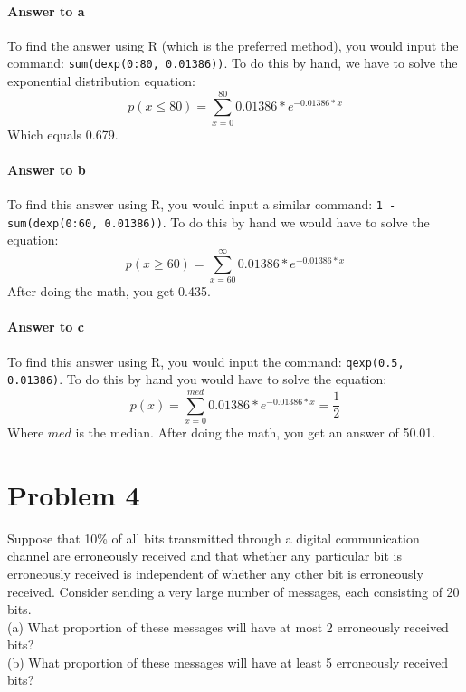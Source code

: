 \documentclass{article}
\newcommand{\code}[1]{\texttt{#1}}
\begin{document}
	\paragraph{Answer to a} To find the answer using R (which is the preferred method), you would 
	input the command: \code{sum(dexp(0:80, 0.01386))}. To do this by hand, we have to solve the 	exponential distribution equation:
	\begin{displaymath}
		p(x \le 80) = \sum_{x=0}^{80} 0.01386*e^{-0.01386*x}
	\end{displaymath}
	Which equals 0.679. %
	
	\paragraph{Answer to b}  To find this answer using R, you would input a similar command: 
	\code{1 - sum(dexp(0:60, 0.01386))}. To do this by hand we would have to solve the equation:
	\begin{displaymath}
		p(x \ge 60) = \sum_{x=60}^{\infty} 0.01386*e^{-0.01386*x}
	\end{displaymath}
	After doing the math, you get 0.435. %
	
	\paragraph{Answer to c} To find this answer using R, you would input the command: 
	\code{qexp(0.5, 0.01386)}. To do this by hand you would have to solve the equation:
	\begin{displaymath}
		p(x) = \sum_{x=0}^{med} 0.01386*e^{-0.01386*x} = \frac{1}{2}
	\end{displaymath}
	Where $med$ is the median. After doing the math, you get an answer of 50.01. %

\clearpage
\section*{Problem 4}

	Suppose that 10\% of all bits transmitted through a digital communication channel are 
	erroneously received and that whether any particular bit is erroneously received is independent 
	of whether any other bit is erroneously received. Consider sending a very large number of 
	messages, each consisting of 20 bits. \\

	(a) What proportion of these messages will have at most 2 erroneously received bits? \\
	(b) What proportion of these messages will have at least 5 erroneously received bits?
\end{document}
